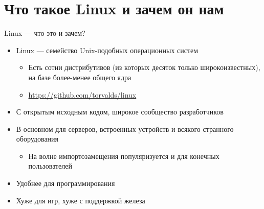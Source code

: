 \documentclass{../../slides-style}
\begin{document}
    
    \begin{frame}[plain]
        \titlepage
    \end{frame}

    \section{Что такое Linux и зачем он нам}

    \begin{frame}{Linux --- что это и зачем?}
        \begin{itemize}
            \item Linux --- семейство Unix-подобных операционных систем
            \begin{itemize}
                \item Есть сотни дистрибутивов (из которых десяток только широкоизвестных), на базе более-менее общего ядра
                \item \url{https://github.com/torvalds/linux}
            \end{itemize}
            \item С открытым исходным кодом, широкое сообщество разработчиков
            \item В основном для серверов, встроенных устройств и всякого странного оборудования
            \begin{itemize}
                \item На волне импортозамещения популяризуется и для конечных пользователей
            \end{itemize}
            \item Удобнее для программирования
            \item Хуже для игр, хуже с поддержкой железа
        \end{itemize}
    \end{frame}
\end{document}
